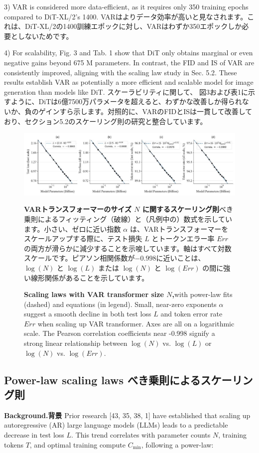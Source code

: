\documentclass{article}
\begin{document}
3) VAR is considered more data-efficient, as it requires only 350 training epochs compared to DiT-XL/2's 1400. 
VARはよりデータ効率が高いと見なされます。これは、DiT-XL/2の1400訓練エポックに対し、VARはわずか350エポックしか必要としないためです。

4) For scalability, Fig. 3 and Tab. 1 show that DiT only obtains marginal or even negative gains beyond 675 M parameters. In contrast, the FID and IS of VAR are consistently improved, aligning with the scaling law study in Sec. 5.2. These results establish VAR as potentially a more efficient and scalable model for image generation than models like DiT.
スケーラビリティに関して、 図3および表1に示すように、DiTは6億7500万パラメータを超えると、わずかな改善しか得られないか、負のゲインすら示します。対照的に、VARのFIDとISは一貫して改善しており、セクション5.2のスケーリング則の研究と整合しています。

\begin{figure}[h]
\begin{center}
  \includegraphics[width=\textwidth]{2025_10_26_62f95e615e8879e267a8g-08}
\caption{\textbf{Scaling laws with VAR transformer size $N$,}with power-law fits (dashed) and equations (in legend). Small, near-zero exponents $\alpha$ suggest a smooth decline in both test loss $L$ and token error rate $E r r$ when scaling up VAR transformer. Axes are all on a logarithmic scale. The Pearson correlation coefficients near -0.998 signify a strong linear relationship between $\log (N)$ vs. $\log (L)$ or $\log (N)$ vs. $\log (E r r)$.}
\textbf{VARトランスフォーマーのサイズ $N$ に関するスケーリング則}べき乗則によるフィッティング（破線）と（凡例中の）数式を示しています。小さい、ゼロに近い指数 $\alpha$ は、VARトランスフォーマーをスケールアップする際に、テスト損失 $L$ とトークンエラー率 $Err$ の両方が滑らかに減少することを示唆しています。軸はすべて対数スケールです。ピアソン相関係数が$-0.998$に近いことは、$\log(N)$ と $\log(L)$ または $\log(N)$ と $\log(Err)$ の間に強い線形関係があることを示しています。
\end{center}
\end{figure}

\subsection{Power-law scaling laws べき乗則によるスケーリング則}
\textbf{Background.背景} Prior research [43, 35, 38, 1] have established that scaling up autoregressive (AR) large language models (LLMs) leads to a predictable decrease in test loss $L$. This trend correlates with parameter counts $N$, training tokens $T$, and optimal training compute $C_{\min }$, following a power-law:
\end{document}
